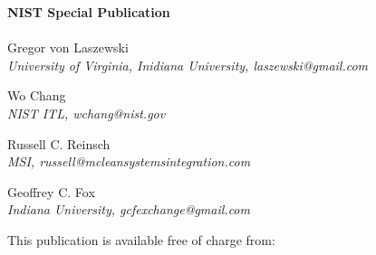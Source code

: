 \begin{titlepage}

\begin{flushright}
\LARGE{\textbf{NIST Special Publication \pubnumber}}\\
\vfill 
\Huge{\textbf{\TITLE}}\\
\vfill
\normalsize Gregor von Laszewski\\
\textit{University of Virginia, Inidiana University, laszewski@gmail.com}\\
\vspace{12pt}

Wo Chang\\
\textit{NIST ITL, wchang@nist.gov}\\
\vspace{12pt}

\normalsize Russell C. Reinsch \\
\textit{MSI, russell@mcleansystemsintegration.com}\\
\vspace{12pt}

\normalsize Geoffrey C. Fox\\
\textit{Indiana University, gcfexchange@gmail.com}
\vspace{12pt}

\vfill
\normalsize This publication is available free of charge from:\\
\DOI\\
\vfill
\normalsize \monthyear
\vfill


\end{flushright}
\end{titlepage}
